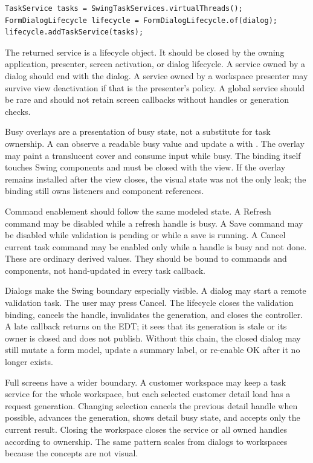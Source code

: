 \begin{lstlisting}[caption={Swing task service for a presenter or dialog.}]
TaskService tasks = SwingTaskServices.virtualThreads();
FormDialogLifecycle lifecycle = FormDialogLifecycle.of(dialog);
lifecycle.addTaskService(tasks);
\end{lstlisting}

The returned service is a lifecycle object. It should be closed by the owning
application, presenter, screen activation, or dialog lifecycle. A service
owned by a dialog should end with the dialog. A service owned by a workspace
presenter may survive view deactivation if that is the presenter's policy. A
global service should be rare and should not retain screen callbacks without
handles or generation checks.

Busy overlays are a presentation of busy state, not a substitute for task
ownership. A  can observe a readable busy value and
update a  with . The overlay may paint a
translucent cover and consume input while busy. The binding itself touches
Swing components and must be closed with the view. If the overlay remains
installed after the view closes, the visual state was not the only leak; the
binding still owns listeners and component references.

Command enablement should follow the same modeled state. A Refresh command may
be disabled while a refresh handle is busy. A Save command may be disabled
while validation is pending or while a save is running. A Cancel current task
command may be enabled only while a handle is busy and not done. These are
ordinary derived values. They should be bound to commands and components, not
hand-updated in every task callback.

Dialogs make the Swing boundary especially visible. A dialog may start a
remote validation task. The user may press Cancel. The lifecycle closes the
validation binding, cancels the handle, invalidates the generation, and closes
the controller. A late callback returns on the EDT; it sees that its generation
is stale or its owner is closed and does not publish. Without this chain, the
closed dialog may still mutate a form model, update a summary label, or
re-enable OK after it no longer exists.

Full screens have a wider boundary. A customer workspace may keep a task
service for the whole workspace, but each selected customer detail load has a
request generation. Changing selection cancels the previous detail handle when
possible, advances the generation, shows detail busy state, and accepts only
the current result. Closing the workspace closes the service or all owned
handles according to ownership. The same pattern scales from dialogs to
workspaces because the concepts are not visual.

